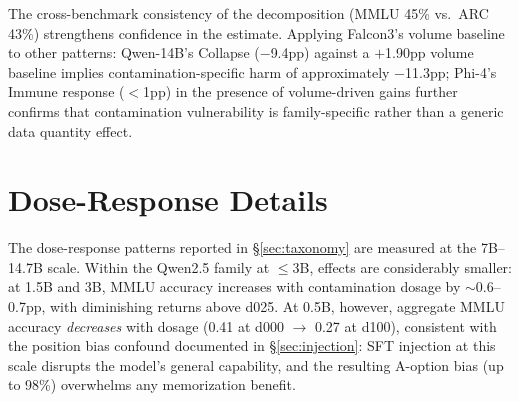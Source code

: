 \begin{table}[h]
\centering
\caption{Volume control decomposition (Falcon3-7B, seed$=$42). Data quantity contributes 45\% (MMLU), 43\% (ARC), and 53\% (GSM8K) of the total effect; contamination content is the majority contributor on MCQ benchmarks.$^{\dagger}$}
\label{tab:volume_control}
\footnotesize
{}
\end{table}

The cross-benchmark consistency of the decomposition (MMLU 45\% vs.\ ARC 43\%) strengthens confidence in the estimate. Applying Falcon3's volume baseline to other patterns: Qwen-14B's Collapse ($-$9.4pp) against a $+$1.90pp volume baseline implies contamination-specific harm of approximately $-$11.3pp; Phi-4's Immune response ($<$1pp) in the presence of volume-driven gains further confirms that contamination vulnerability is family-specific rather than a generic data quantity effect.

\section{Dose-Response Details}
\label{sec:dose_response_details}

The dose-response patterns reported in \S\ref{sec:taxonomy} are measured at the 7B--14.7B scale. Within the Qwen2.5 family at $\leq$3B, effects are considerably smaller: at 1.5B and 3B, MMLU accuracy increases with contamination dosage by ${\sim}$0.6--0.7pp, with diminishing returns above d025. At 0.5B, however, aggregate MMLU accuracy \textit{decreases} with dosage (0.41 at d000 $\to$ 0.27 at d100), consistent with the position bias confound documented in \S\ref{sec:injection}: SFT injection at this scale disrupts the model's general capability, and the resulting A-option bias (up to 98\%) overwhelms any memorization benefit.

